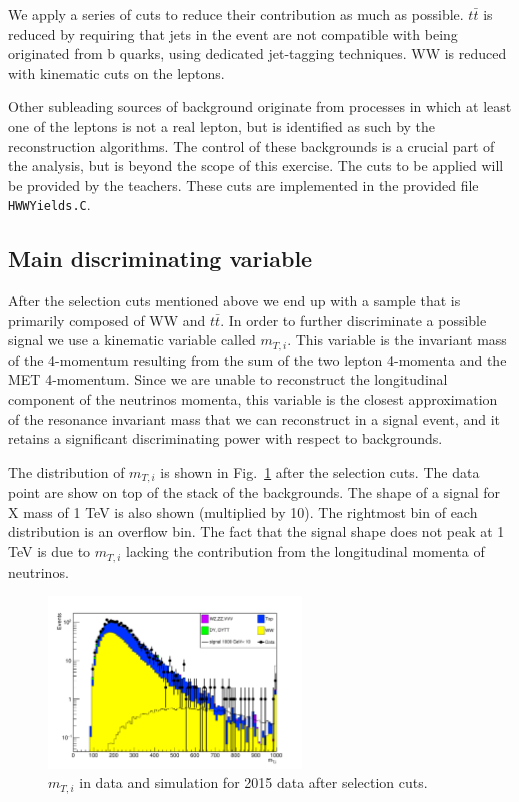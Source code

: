 \documentclass[a4paper,12pt]{article}
\begin{document}
We apply a series of cuts to reduce their contribution as much as possible.
$t\bar{t}$ is reduced by requiring that jets in the event are not compatible
with being originated from b quarks, using dedicated jet-tagging techniques.
WW is reduced with kinematic cuts on the leptons.

Other subleading sources of background originate from processes in which at
least one of the leptons is not a real lepton, but is identified as such by the
reconstruction algorithms. The control of these backgrounds is a crucial part of the analysis,
but is beyond the scope of this exercise. The cuts to be applied will be
provided by the teachers. These cuts are implemented in the provided file
\verb+HWWYields.C+.

\subsection{Main discriminating variable}
After the selection cuts mentioned above we end up
with a sample that is primarily composed of WW and $t\bar{t}$. In order to
further discriminate a possible signal we use a kinematic
variable called $m_{T,i}$. This variable is the invariant mass of the
4-momentum resulting from the sum of the two lepton 4-momenta and the MET
4-momentum. Since we are unable to reconstruct the longitudinal component of
the neutrinos momenta, this variable is the closest approximation of
the resonance invariant mass that we can reconstruct in a signal event, and it retains a
significant discriminating power with respect to backgrounds.

The distribution of  $m_{T,i}$ is shown in Fig.~\ref{fig:mti} after the
selection cuts. The data point are show on top of the stack of the
backgrounds. The shape of a signal for X mass of 1 TeV is also shown
(multiplied by 10). The rightmost bin of each distribution is an overflow bin.
The fact that the signal shape does not peak at 1 TeV is due to 
$m_{T,i}$ lacking the contribution from the longitudinal  momenta of neutrinos.
\begin{figure}[!b]
\centering
\includegraphics[width=0.6\textwidth]{images/mTi.pdf}
\caption{$m_{T,i}$ in data and simulation for 2015 data after selection cuts.\label{fig:mti}}
\end{figure}
\end{document}
